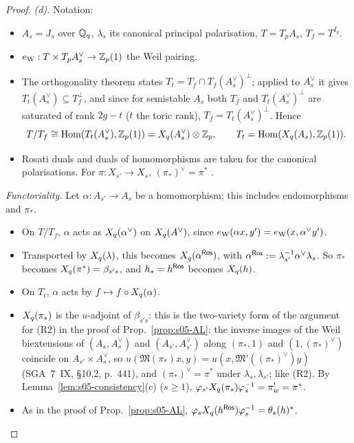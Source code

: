 \begin{proof}
\emph{(d).} Notation:
\begin{itemize}
\item $A_s=J_s$ over $\mathbb{Q}_q$, $\lambda_s$ its canonical principal polarisation, $T=T_pA_s$, $T_f=T^{I_q}$.
\item $e_{\rm W}:T\times T_pA_s^\vee\to\mathbb{Z}_p(1)$ the Weil pairing.
\item The orthogonality theorem 
  states $T_t=T_f\cap T_f(A^\vee_s)^\perp$; applied to $A_s^\vee$ it gives $T_t(A_s^\vee)\subseteq T_f^\perp$, and since for semistable $A_s$ both $T_f$ and
  $T_t(A_s^\vee)^\perp$ are saturated of rank $2g-t$ ($t$ the toric rank), $T_f=T_t(A_s^\vee)^\perp$. Hence
  \[T/T_f\cong\operatorname{Hom}(T_t(A^\vee_s),\mathbb{Z}_p(1))=X_q(A_s^\vee)\otimes\mathbb{Z}_p,\qquad T_t=\operatorname{Hom}(X_q(A_s),\mathbb{Z}_p(1)).\]
\item Rosati duals and duals of homomorphisms are taken for the canonical polarisations. For $\pi:X_{s'}\to X_s$, $(\pi_*)^\vee=\pi^*$
  .
\end{itemize}
\emph{Functoriality.} Let $\alpha:A_{s'}\to A_s$ be a homomorphism; this includes endomorphisms and $\pi_*$.
\begin{itemize}
\item On $T/T_f$, $\alpha$ acts as $X_q(\alpha^\vee)$ on $X_q(A^\vee)$, since $e_{\rm W}(\alpha x,y')=e_{\rm W}(x,\alpha^\vee y')$.
\item Transported by $X_q(\lambda)$, this becomes $X_q(\alpha^{\mathsf{Ros}})$, with $\alpha^{\mathsf{Ros}}:=\lambda_{s'}^{-1}\alpha^\vee\lambda_s$. So $\pi_*$ becomes $X_q(\pi^*)=\beta_{s's}$, and
  $h_*=h^{\mathsf{Ros}}$ becomes $X_q(h)$.
\item On $T_t$, $\alpha$ acts by $f\mapsto f\circ X_q(\alpha)$.
\item $X_q(\pi_*)$ is the $u$-adjoint of $\beta_{s's}$: this is the two-variety form of the argument for (R2) in the proof of Prop.~\ref{prop:s05-AL}: the inverse images of the Weil
  biextensions of $(A_s,A_s^\vee)$ and $(A_{s'},A_{s'}^\vee)$ along $(\pi_*,1)$ and $(1,(\pi_*)^\vee)$ coincide on $A_{s'}\times A_s^\vee$, so
  $u(\mathfrak{M}(\pi_*)x,y)=u(x,\mathfrak{M}'((\pi_*)^\vee)y)$ (SGA~7~IX, \S10.2, p.~441), and $(\pi_*)^\vee=\pi^*$ under $\lambda_s,\lambda_{s'}$; \stpmc{} like (R2).
  By Lemma~\ref{lem:s05-consistency}(c) ($s\ge1$), $\varphi_{s'}X_q(\pi_*)\varphi_s^{-1}=\pi^!_w=\pi^*$.
\item As in the proof of Prop.~\ref{prop:s05-AL}, $\varphi_sX_q(h^{\mathsf{Ros}})\varphi_s^{-1}=\theta_s(h)^*$.

\end{itemize}
\end{proof}
